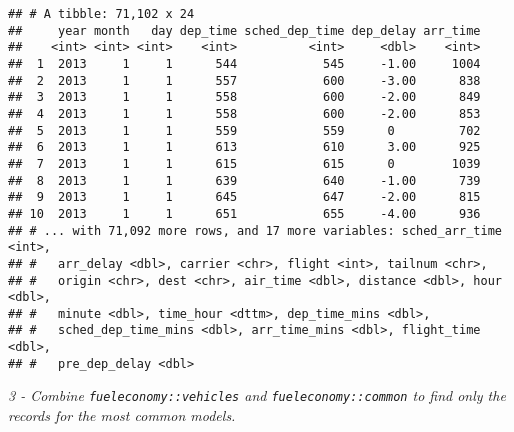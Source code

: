 \documentclass[]{article}
\newenvironment{Shaded}{\begin{snugshade}}{\end{snugshade}}
\newcommand{\KeywordTok}[1]{\textcolor[rgb]{0.13,0.29,0.53}{\textbf{#1}}}
\newcommand{\DataTypeTok}[1]{\textcolor[rgb]{0.13,0.29,0.53}{#1}}
\newcommand{\DecValTok}[1]{\textcolor[rgb]{0.00,0.00,0.81}{#1}}
\newcommand{\StringTok}[1]{\textcolor[rgb]{0.31,0.60,0.02}{#1}}
\newcommand{\OperatorTok}[1]{\textcolor[rgb]{0.81,0.36,0.00}{\textbf{#1}}}
\newcommand{\NormalTok}[1]{#1}
\theoremstyle{definition}
\theoremstyle{definition}
\theoremstyle{definition}
\theoremstyle{remark}
\begin{document}
\begin{Shaded}
\end{Shaded}

\begin{verbatim}
## # A tibble: 71,102 x 24
##     year month   day dep_time sched_dep_time dep_delay arr_time
##    <int> <int> <int>    <int>          <int>     <dbl>    <int>
##  1  2013     1     1      544            545     -1.00     1004
##  2  2013     1     1      557            600     -3.00      838
##  3  2013     1     1      558            600     -2.00      849
##  4  2013     1     1      558            600     -2.00      853
##  5  2013     1     1      559            559      0         702
##  6  2013     1     1      613            610      3.00      925
##  7  2013     1     1      615            615      0        1039
##  8  2013     1     1      639            640     -1.00      739
##  9  2013     1     1      645            647     -2.00      815
## 10  2013     1     1      651            655     -4.00      936
## # ... with 71,092 more rows, and 17 more variables: sched_arr_time <int>,
## #   arr_delay <dbl>, carrier <chr>, flight <int>, tailnum <chr>,
## #   origin <chr>, dest <chr>, air_time <dbl>, distance <dbl>, hour <dbl>,
## #   minute <dbl>, time_hour <dttm>, dep_time_mins <dbl>,
## #   sched_dep_time_mins <dbl>, arr_time_mins <dbl>, flight_time <dbl>,
## #   pre_dep_delay <dbl>
\end{verbatim}

\emph{3 - Combine \texttt{fueleconomy::vehicles} and
\texttt{fueleconomy::common} to find only the records for the most
common models.}

\begin{Shaded}
\end{Shaded}
\end{document}
